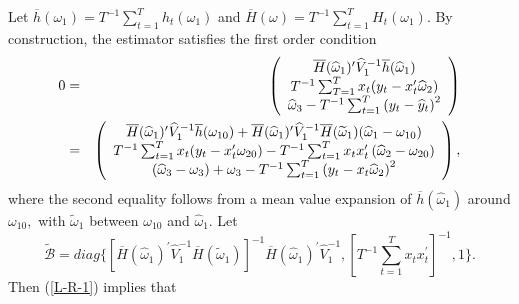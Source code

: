 \documentclass[11pt]{article}
\begin{document}
Let $\overline{h}(\omega _{1})=T^{-1}\sum_{t=1}^{T}h_{t}(\omega _{1})$ and $%
\overline{H}(\omega )=T^{-1}\sum_{t=1}^{T}H_{t}(\omega _{1}).$ By
construction, the estimator satisfies the first order condition%
\begin{eqnarray}
0 &=&\left( 
\begin{array}{c}
\overline{H}(\widehat{\omega }_{1})^{\prime }\widehat{V}_{1}^{-1}\overline{h}%
(\widehat{\omega }_{1}) \\ 
T^{-1}\sum_{T=1}^{T}x_{t}(y_{t}-x_{t}^{\prime }\widehat{\omega }_{2}) \\ 
\widehat{\omega }_{3}-T^{-1}\sum_{t=1}^{T}\left( y_{t}-\widehat{y}%
_{t}\right) ^{2}%
\end{array}%
\right)  \notag \\
&=&\left( 
\begin{array}{c}
\overline{H}(\widehat{\omega }_{1})^{\prime }\widehat{V}_{1}^{-1}\overline{h}%
(\omega _{10})+\overline{H}(\widehat{\omega }_{1})^{\prime }\widehat{V}%
_{1}^{-1}\overline{H}(\widetilde{\omega }_{1})(\widehat{\omega }_{1}-\omega
_{10}) \\ 
T^{-1}\sum_{t=1}^{T}x_{t}(y_{t}-x_{t}^{\prime }\omega
_{20})-T^{-1}\sum_{t=1}^{T}x_{t}x_{t}^{\prime }\left( \widehat{\omega }%
_{2}-\omega _{20}\right) \\ 
\left( \widehat{\omega }_{3}-\omega _{3}\right) +\omega
_{3}-T^{-1}\sum_{t=1}^{T}\left( y_{t}-x_{t}\widehat{\omega }_{2}\right) ^{2}%
\end{array}%
\right) ,  \label{L-R-1}
\end{eqnarray}%
where the second equality follows from a mean value expansion of $\overline{h%
}(\widehat{\omega }_{1})$ around $\omega _{10},$ with $\widetilde{\omega }%
_{1}$ between $\omega _{10}$ and $\widehat{\omega }_{1}$. Let%
\begin{equation}
\widetilde{\mathcal{B}}=diag\{[\overline{H}(\widehat{\omega }_{1})^{\prime }%
\widehat{V}_{1}^{-1}\overline{H}(\widetilde{\omega }_{1})]^{-1}\overline{H}(%
\widehat{\omega }_{1})^{\prime }\widehat{V}_{1}^{-1},[T^{-1}%
\sum_{t=1}^{T}x_{t}x_{t}^{\prime }]^{-1},1\}.
\end{equation}%
Then (\ref{L-R-1}) implies that 
\end{document}
